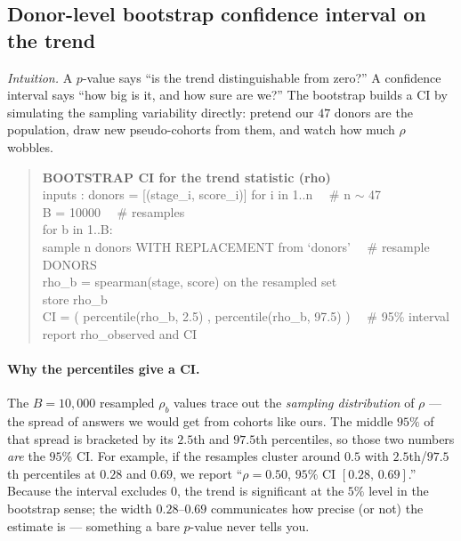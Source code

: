 \documentclass[11pt]{article}
\begin{document}
\subsection{Donor-level bootstrap confidence interval on the trend}

\textit{Intuition.} A $p$-value says ``is the trend distinguishable from zero?'' A confidence interval says ``how big is it, and how sure are we?'' The bootstrap builds a CI by simulating the sampling variability directly: pretend our $47$ donors are the population, draw new pseudo-cohorts from them, and watch how much $\rho$ wobbles.

\begin{quote}
\ttfamily
\textbf{BOOTSTRAP CI for the trend statistic (rho)}\\
inputs : donors = [(stage\_i, score\_i)] for i in 1..n \ \ \# n $\sim$ 47\\
B = 10000 \ \ \# resamples\\
for b in 1..B:\\
\hspace*{2em}sample n donors WITH REPLACEMENT from `donors' \ \ \# resample DONORS\\
\hspace*{2em}rho\_b = spearman(stage, score) on the resampled set\\
\hspace*{2em}store rho\_b\\
CI = ( percentile(rho\_b, 2.5) , percentile(rho\_b, 97.5) ) \ \ \# 95\% interval\\
report rho\_observed and CI
\end{quote}

\paragraph{Why the percentiles give a CI.} The $B=10{,}000$ resampled $\rho_b$ values trace out the \emph{sampling distribution} of $\rho$ --- the spread of answers we would get from cohorts like ours. The middle $95\%$ of that spread is bracketed by its $2.5$th and $97.5$th percentiles, so those two numbers \emph{are} the $95\%$ CI. For example, if the resamples cluster around $0.5$ with $2.5$th/$97.5$th percentiles at $0.28$ and $0.69$, we report ``$\rho = 0.50$, $95\%$ CI $[0.28,\,0.69]$.'' Because the interval excludes $0$, the trend is significant at the $5\%$ level in the bootstrap sense; the width $0.28$--$0.69$ communicates how precise (or not) the estimate is --- something a bare $p$-value never tells you.
\end{document}
